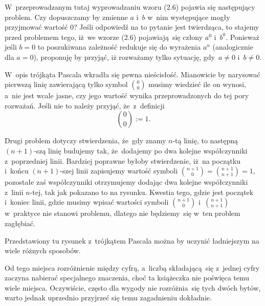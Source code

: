 \documentclass[a4paper,11pt]{article}
\numberwithin{equation}{section}
\begin{document}
\VerSpaceFour





\noindent
{} W~przeprowadzanym tutaj wyprowadzaniu wzoru (2.6) pojawia się
następujący problem. Czy dopuszczamy by zmienne $a$ i~$b$ w~nim występujące
mogły przyjmować wartość $0$? Jeśli odpowiedź na to pytanie jest twierdząca,
to stajemy przed problemem tego, iż~we wzorze (2.6) pojawiają~się
człony $a^{ 0 }$ i~$b^{ 0 }$. Ponieważ jeśli $b = 0$ to poszukiwana zależność
redukuje się do wyrażenia $a^{ n }$ (analogicznie dla $a = 0$), proponuję by
przyjąć, iż rozważamy tylko sytuację, gdy~$a \neq 0$ i~$b \neq 0$.

\VerSpaceFour





 W~opis trójkąta Pascala wkradła się pewna nieścisłość.
Mianowicie by
narysować pierwszą linię zawierającą tylko symbol $\binom{ 0 }{ 0 }$ musimy
wiedzieć
ile on wynosi, a~nie jest wcale jasne, czy jego wartość wynika
przeprowadzonych
do tej pory rozważań. Jeśli nie to należy przyjąć, że~z~definicji
\begin{equation}
  \label{Gancarzewicz-Arytmetyka-03}
  \binom{ 0 }{ 0 } := 1.
\end{equation}

Drugi problem dotyczy stwierdzenia, że~gdy znamy $n$-tą linię, to następną
$( n + 1 )$-szą linię budujemy tak, że~dodajemy po dwa kolejne współczynniki
z~poprzedniej linii. Bardziej poprawne byłoby stwierdzenie, iż~na początku
i~końcu $( n + 1 )$-szej linii zapisujemy wartość symboli
$\binom{ n + 1 }{ 0 } = \binom{ n + 1 }{ n + 1 } = 1$, pozostałe zaś
współczynniki otrzymujemy dodając dwa kolejne współczynniki z~linii $n$-tej,
tak jak pokazano to na rysunku. Kwestia tego, gdzie jest początek i~koniec
linii, gdzie musimy wpisać wartości symboli $\binom{ n + 1 }{ 0 }$
i~$\binom{ n + 1 }{ n + 1 }$ w~praktyce nie stanowi problemu, dlatego nie
będziemy~się w~ten problem zagłębiać.

\VerSpaceFour





\noindent
{} Przedstawiony tu rysunek z~trójkątem Pascala można by uczynić
ładniejszym na wiele różnych sposobów.

\VerSpaceFour





\noindent
{} Od tego miejsca rozróżnienie między cyfrą, a~liczbą składającą~się
z~jednej cyfry zaczyna nabierać specjalnego znaczenia, choć ta książeczka
nie poświęca temu wiele miejsca. Oczywiście, często dla wygody nie
rozróżnia~się tych dwóch bytów, warto jednak uprzednio przyjrzeć się temu
zagadnieniu dokładnie.
\end{document}
